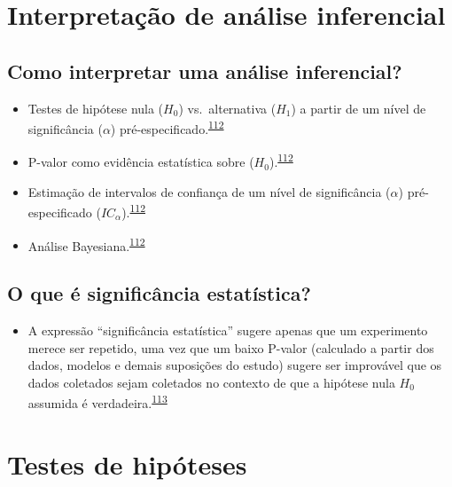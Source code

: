 \documentclass[
  a4paper,
]{book}
\providecommand{\tightlist}{%
  \setlength{\itemsep}{0pt}\setlength{\parskip}{0pt}}
\begin{document}
\hypertarget{interpretauxe7uxe3o-de-anuxe1lise-inferencial}{%
\section{Interpretação de análise inferencial}\label{interpretauxe7uxe3o-de-anuxe1lise-inferencial}}

\hypertarget{como-interpretar-uma-anuxe1lise-inferencial}{%
\subsection{Como interpretar uma análise inferencial?}\label{como-interpretar-uma-anuxe1lise-inferencial}}

\begin{itemize}
\item
  Testes de hipótese nula (\(H_{0}\)) vs.~alternativa (\(H_{1}\)) a partir de um nível de significância (\(\alpha\)) pré-especificado.\textsuperscript{\protect\hyperlink{ref-goodman2016}{112}}
\item
  P-valor como evidência estatística sobre (\(H_{0}\)).\textsuperscript{\protect\hyperlink{ref-goodman2016}{112}}
\item
  Estimação de intervalos de confiança de um nível de significância (\(\alpha\)) pré-especificado (\(IC_{\alpha}\)).\textsuperscript{\protect\hyperlink{ref-goodman2016}{112}}
\item
  Análise Bayesiana.\textsuperscript{\protect\hyperlink{ref-goodman2016}{112}}
\end{itemize}

\hypertarget{o-que-uxe9-significuxe2ncia-estatuxedstica}{%
\subsection{O que é significância estatística?}\label{o-que-uxe9-significuxe2ncia-estatuxedstica}}

\begin{itemize}
\tightlist
\item
  A expressão ``significância estatística'' sugere apenas que um experimento merece ser repetido, uma vez que um baixo P-valor (calculado a partir dos dados, modelos e demais suposições do estudo) sugere ser improvável que os dados coletados sejam coletados no contexto de que a hipótese nula \(H_{0}\) assumida é verdadeira.\textsuperscript{\protect\hyperlink{ref-aylmerfisher1926}{113}}
\end{itemize}

\hypertarget{erros-inferencia}{%
\section{Testes de hipóteses}\label{erros-inferencia}}
\end{document}
